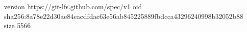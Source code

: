 version https://git-lfs.github.com/spec/v1
oid sha256:8a78e22d30ae84eacdfdae63e56ab845225889fbdcca43296240998b32052b88
size 5566
